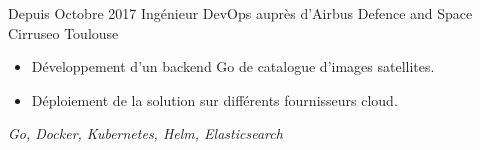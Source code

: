\cventry
    {Depuis Octobre 2017}
    {Ingénieur DevOps auprès d'Airbus Defence and Space}
    {}
    {Cirruseo}
    {Toulouse}
    {
        \begin{itemize}
            \item Développement d'un backend Go de catalogue d'images satellites.
            \item Déploiement de la solution sur différents fournisseurs cloud.
        \end{itemize}
        \textit{Go, Docker, Kubernetes, Helm, Elasticsearch}
    }
